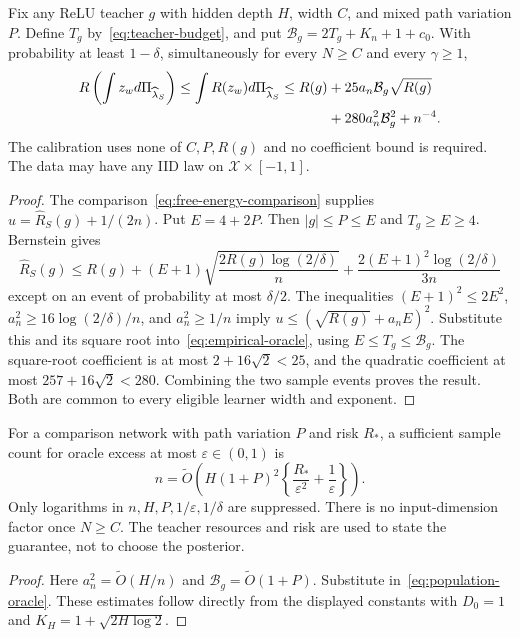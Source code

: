 \begin{theorem}
\label{thm:main}
Fix any ReLU teacher $g$ with hidden depth $H$, width $C$, and mixed path variation $P$. Define $T_g$ by~\eqref{eq:teacher-budget}, and put $\mathcal B_g=2T_g+K_n+1+c_0$. With probability at least $1-\delta$, simultaneously for every $N\ge C$ and every $\gamma\ge1$,
\begin{align}
 R\left(\int z_wd\Pi_{\widehat\lambda_S}\right)
 \le\int R(z_w)d\Pi_{\widehat\lambda_S}
 \le R(g)&+25a_n\mathcal B_g\sqrt{R(g)}\notag\\
 &+280a_n^2\mathcal B_g^2+n^{-4}.
 \label{eq:population-oracle}
\end{align}
The calibration uses none of $C,P,R(g)$ and no coefficient bound is required. The data may have any IID law on $\mathcal X\times[-1,1]$.
\end{theorem}
\begin{proof}
The comparison~\eqref{eq:free-energy-comparison} supplies $u=\widehat R_S(g)+1/(2n)$. Put $E=4+2P$. Then $|g|\le P\le E$ and $T_g\ge E\ge4$. Bernstein gives
\[
 \widehat R_S(g)\le R(g)+(E+1)\sqrt{\frac{2R(g)\log(2/\delta)}n}
                  +\frac{2(E+1)^2\log(2/\delta)}{3n}
\]
except on an event of probability at most $\delta/2$. The inequalities $(E+1)^2\le2E^2$, $a_n^2\ge16\log(2/\delta)/n$, and $a_n^2\ge1/n$ imply
$u\le(\sqrt{R(g)}+a_nE)^2$.
Substitute this and its square root into~\eqref{eq:empirical-oracle}, using $E\le T_g\le\mathcal B_g$. The square-root coefficient is at most $2+16\sqrt2<25$, and the quadratic coefficient at most $257+16\sqrt2<280$. Combining the two sample events proves the result. Both are common to every eligible learner width and exponent.
\end{proof}

\begin{corollary}
\label{cor:polynomial}
For a comparison network with path variation $P$ and risk $R_*$, a sufficient sample count for oracle excess at most $\varepsilon\in(0,1)$ is
\begin{equation}
 n=\widetilde O\left(H(1+P)^2\left\{\frac{R_*}{\varepsilon^2}+\frac1\varepsilon\right\}\right).
 \label{eq:sample-budget}
\end{equation}
Only logarithms in $n,H,P,1/\varepsilon,1/\delta$ are suppressed. There is no input-dimension factor once $N\ge C$. The teacher resources and risk are used to state the guarantee, not to choose the posterior.
\end{corollary}
\begin{proof}
Here $a_n^2=\widetilde O(H/n)$ and $\mathcal B_g=\widetilde O(1+P)$. Substitute in~\eqref{eq:population-oracle}. These estimates follow directly from the displayed constants with $D_0=1$ and $K_H=1+\sqrt{2H\log2}$.
\end{proof}


